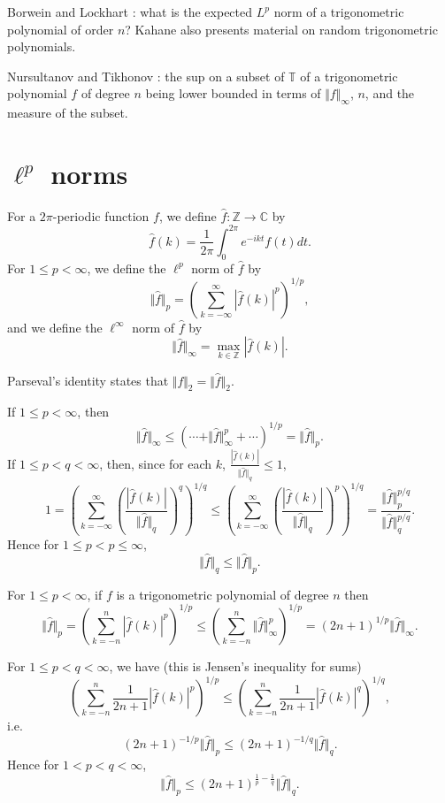 \documentclass{article}
\newcommand{\norm}[1]{\Vert #1 \Vert}
\begin{document}
Borwein and Lockhart \cite{MR1814174}: what is the expected $L^p$ norm of a trigonometric polynomial of order $n$?
Kahane \cite[Chapter~6]{kahane} also presents material on random trigonometric polynomials. 







Nursultanov and Tikhonov \cite{MR3078275}: the sup on a subset of $\mathbb{T}$ of a trigonometric polynomial $f$ of degree $n$  being lower
bounded in terms of $\norm{f}_\infty$, $n$,  and the measure of the subset. 

\section{$\ell^p$ norms}
For a $2\pi$-periodic function $f$, we define $\hat{f}:\mathbb{Z} \to \mathbb{C}$ by
\[
\hat{f}(k)=\frac{1}{2\pi} \int_0^{2\pi} e^{-ikt} f(t) dt.
\]
For $1 \leq p < \infty$, we define the $\ell^p$ norm of $\hat{f}$ by 
\[
\norm{\hat{f}}_p=\left( \sum_{k=-\infty}^\infty |\hat{f}(k)|^p \right)^{1/p},
\]
and we define the $\ell^\infty$ norm of $\hat{f}$ by 
\[
\norm{\hat{f}}_\infty=\max_{k \in \mathbb{Z}} |\hat{f}(k)|.
\]

Parseval's identity \cite[p.~80, Theorem~1.3]{steinI} states that $\norm{f}_2=\norm{\hat{f}}_2$.




If $1 \leq p < \infty$, then
\[
\norm{\hat{f}}_\infty \leq \left( \cdots+\norm{\hat{f}}_\infty^p + \cdots \right)^{1/p}= \norm{\hat{f}}_p.
\]
If $1 \leq p < q < \infty$, then, since for each $k$, $\frac{|\hat{f}(k)|}{\norm{\hat{f}}_q} \leq 1$,
\[
1=\left( \sum_{k=-\infty}^\infty \left( \frac{|\hat{f}(k)|}{\norm{\hat{f}}_q} \right)^q \right)^{1/q} \leq
\left( \sum_{k=-\infty}^\infty \left( \frac{|\hat{f}(k)|}{\norm{\hat{f}}_q} \right)^p \right)^{1/q} 
=\frac{\norm{\hat{f}}_p^{p/q}}{\norm{\hat{f}}_q^{p/q}}.
\]
Hence for $1 \leq p < p \leq \infty$,
\[
\norm{\hat{f}}_q \leq \norm{\hat{f}}_p.
\]

For $1 \leq p < \infty$, if $f$ is a trigonometric polynomial of degree $n$ then 
\[
\norm{\hat{f}}_p 
=\left( \sum_{k=-n}^n |\hat{f}(k)|^p \right)^{1/p} \leq \left( \sum_{k=-n}^n \norm{\hat{f}}_\infty^p \right)^{1/p}
=(2n+1)^{1/p} \norm{\hat{f}}_\infty.
\]

For $1 \leq p < q < \infty$, we have \cite[p.~123, Problem~8.3]{master} (this is  Jensen's inequality for sums)
\[
\left( \sum_{k=-n}^n \frac{1}{2n+1} |\hat{f}(k)|^p \right)^{1/p} \leq \left( \sum_{k=-n}^n \frac{1}{2n+1} |\hat{f}(k)|^q \right)^{1/q},
\]
i.e.
\[
(2n+1)^{-1/p}  \norm{\hat{f}}_p \leq (2n+1)^{-1/q} \norm{\hat{f}}_q.
\]
Hence for $1 < p < q < \infty$,
\[
\norm{\hat{f}}_p \leq (2n+1)^{\frac{1}{p}-\frac{1}{q}} \norm{\hat{f}}_q.
\]
\end{document}
